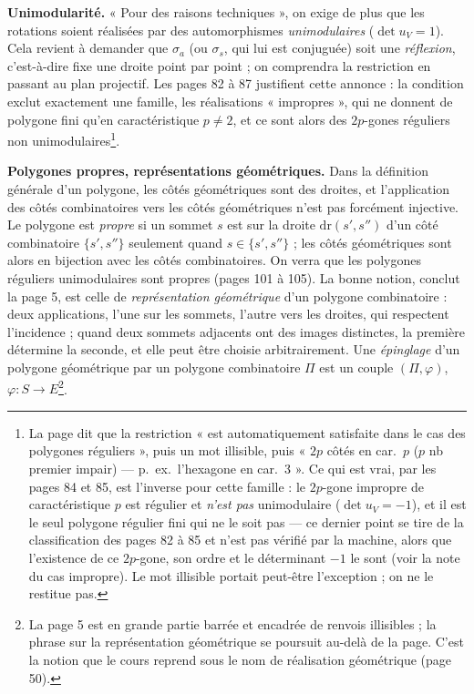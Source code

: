 \documentclass[11pt,a4paper]{article}
\begin{document}
\textbf{Unimodularité.} « Pour des raisons techniques », on exige de plus que
les rotations soient réalisées par des automorphismes \emph{unimodulaires}
($\det u_V = 1$). Cela revient à demander que $\sigma_a$ (ou $\sigma_s$, qui
lui est conjuguée) soit une \emph{réflexion}, c'est-à-dire fixe une droite
point par point ; on comprendra la restriction en passant au plan projectif.
Les pages 82 à 87 justifient cette annonce : la condition exclut exactement
une famille, les réalisations « impropres », qui ne donnent de polygone fini
qu'en caractéristique $p \neq 2$, et ce sont alors des $2p$-gones réguliers non
unimodulaires\footnote{La page dit que la restriction « est automatiquement
satisfaite dans le cas des polygones réguliers », puis un mot illisible, puis « $2p$ côtés
en car.\ $p$ ($p$ nb premier impair) --- p.\ ex.\ l'hexagone en car.\ 3 ». Ce
qui est vrai, par les pages 84 et 85, est l'inverse pour cette famille : le
$2p$-gone impropre de caractéristique $p$ est régulier et \emph{n'est pas}
unimodulaire ($\det u_V = -1$), et il est le seul polygone régulier fini qui
ne le soit pas --- ce dernier point se tire de la classification des pages 82
à 85 et n'est pas vérifié par la machine, alors que l'existence de ce
$2p$-gone, son ordre et le déterminant $-1$ le sont (voir la note du cas
impropre). Le mot illisible portait peut-être l'exception ; on ne le
restitue pas.}.

\textbf{Polygones propres, représentations géométriques.} Dans la définition
générale d'un polygone, les côtés géométriques sont des droites, et
l'application des côtés combinatoires vers les côtés géométriques n'est pas
forcément injective. Le polygone est \emph{propre} si un sommet $s$ est sur la
droite $\mathrm{dr}(s', s'')$ d'un côté combinatoire $\{s', s''\}$ seulement
quand $s \in \{s', s''\}$ ; les côtés géométriques sont alors en bijection avec
les côtés combinatoires. On verra que les polygones réguliers unimodulaires
sont propres (pages 101 à 105). La bonne notion, conclut la page 5, est celle
de \emph{représentation géométrique} d'un polygone combinatoire : deux
applications, l'une sur les sommets, l'autre vers les droites, qui respectent
l'incidence ; quand deux sommets adjacents ont des images distinctes, la
première détermine la seconde, et elle peut être choisie arbitrairement. Une
\emph{épinglage} d'un polygone géométrique par un polygone combinatoire $\Pi$
est un couple $(\Pi, \varphi)$, $\varphi : S \to E$\footnote{La page 5 est en
grande partie barrée et encadrée de renvois illisibles ; la phrase sur la
représentation géométrique se poursuit au-delà de la page. C'est la notion que
le cours reprend sous le nom de réalisation géométrique (page 50).}.
\end{document}
